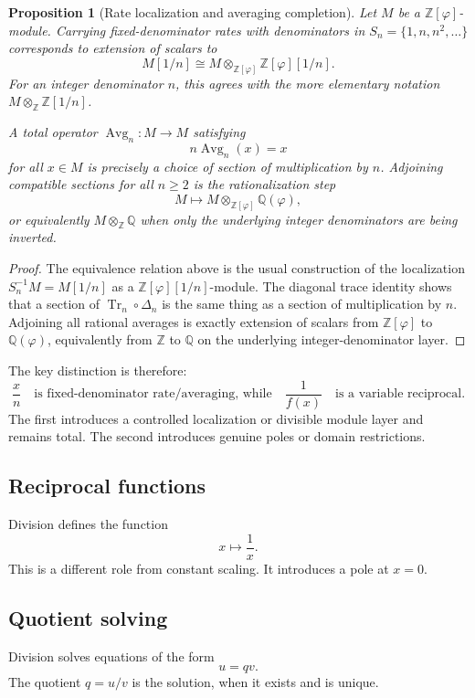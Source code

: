 \documentclass[11pt]{article}
\newtheorem{proposition}[definition]{Proposition}
\newcommand{\Tr}{\operatorname{Tr}}
\newcommand{\ph}{\varphi}
\newcommand{\Z}{\mathbb{Z}}
\newcommand{\Q}{\mathbb{Q}}
\begin{document}
\begin{proposition}[Rate localization and averaging completion]
Let $M$ be a $\Z[\ph]$-module.  Carrying fixed-denominator rates with denominators in $S_n=\{1,n,n^2,\dots\}$ corresponds to extension of scalars to
\[
    M[1/n]\cong M\otimes_{\Z[\ph]}\Z[\ph][1/n].
\]
For an integer denominator $n$, this agrees with the more elementary notation $M\otimes_{\Z}\Z[1/n]$.

A total operator $\operatorname{Avg}_n:M\to M$ satisfying
\[
    n\operatorname{Avg}_n(x)=x
\]
for all $x\in M$ is precisely a choice of section of multiplication by $n$.  Adjoining compatible sections for all $n\ge2$ is the rationalization step
\[
    M\longmapsto M\otimes_{\Z[\ph]}\Q(\ph),
\]
or equivalently $M\otimes_{\Z}\Q$ when only the underlying integer denominators are being inverted.
\end{proposition}

\begin{proof}
The equivalence relation above is the usual construction of the localization $S_n^{-1}M=M[1/n]$ as a $\Z[\ph][1/n]$-module.  The diagonal trace identity shows that a section of $\Tr_n\circ\Delta_n$ is the same thing as a section of multiplication by $n$.  Adjoining all rational averages is exactly extension of scalars from $\Z[\ph]$ to $\Q(\ph)$, equivalently from $\Z$ to $\Q$ on the underlying integer-denominator layer.
\end{proof}

The key distinction is therefore:
\[
    \frac{x}{n}
    \quad\text{is fixed-denominator rate/averaging, while}\quad
    \frac{1}{f(x)}
    \quad\text{is a variable reciprocal.}
\]
The first introduces a controlled localization or divisible module layer and remains total.  The second introduces genuine poles or domain restrictions.

\subsection{Reciprocal functions}

Division defines the function
\[
    x\mapsto \frac1x.
\]
This is a different role from constant scaling.  It introduces a pole at $x=0$.

\subsection{Quotient solving}

Division solves equations of the form
\[
    u=qv.
\]
The quotient $q=u/v$ is the solution, when it exists and is unique.
\end{document}
